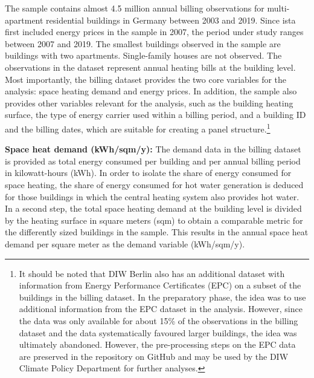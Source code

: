 \documentclass[12pt,twoside]{reedthesis}
\begin{document}
The sample contains almost 4.5 million annual billing observations for multi-apartment residential buildings in Germany between 2003 and 2019. Since ista first included energy prices in the sample in 2007, the period under study ranges between 2007 and 2019. The smallest buildings observed in the sample are buildings with two apartments. Single-family houses are not observed. The observations in the dataset represent annual heating bills at the building level. Most importantly, the billing dataset provides the two core variables for the analysis: space heating demand and energy prices. In addition, the sample also provides other variables relevant for the analysis, such as the building heating surface, the type of energy carrier used within a billing period, and a building ID and the billing dates, which are suitable for creating a panel structure.\footnote{It should be noted that DIW Berlin also has an additional dataset with information from Energy Performance Certificates (EPC) on a subset of the buildings in the billing dataset. In the preparatory phase, the idea was to use additional information from the EPC dataset in the analysis. However, since the data was only available for about 15\% of the observations in the billing dataset and the data systematically favoured larger buildings, the idea was ultimately abandoned. However, the pre-processing steps on the EPC data are preserved in the repository on GitHub and may be used by the DIW Climate Policy Department for further analyses.}

\textbf{Space heat demand (kWh/sqm/y):} The demand data in the billing dataset is provided as total energy consumed per building and per annual billing period in kilowatt-hours (kWh). In order to isolate the share of energy consumed for space heating, the share of energy consumed for hot water generation is deduced for those buildings in which the central heating system also provides hot water. In a second step, the total space heating demand at the building level is divided by the heating surface in square meters (sqm) to obtain a comparable metric for the differently sized buildings in the sample. This results in the annual space heat demand per square meter as the demand variable (kWh/sqm/y).
\end{document}
